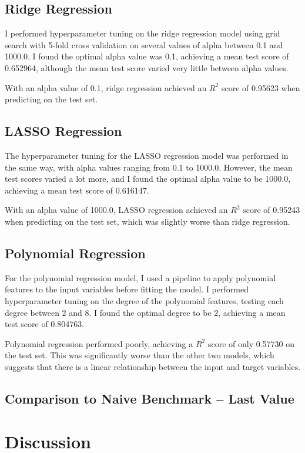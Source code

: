 \documentclass[a4paper, 11pt]{article}
\begin{document}
\subsection{Ridge Regression}
I performed hyperparameter tuning on the ridge regression model using grid search with 5-fold cross validation on several values of alpha between 0.1 and 1000.0. I found the optimal alpha value was 0.1, achieving a mean test score of 0.652964, although the mean test score varied very little between alpha values.

With an alpha value of 0.1, ridge regression achieved an $R^2$ score of 0.95623 when predicting on the test set.

\subsection{LASSO Regression}
The hyperparameter tuning for the LASSO regression model was performed in the same way, with alpha values ranging from 0.1 to 1000.0. However, the mean test scores varied a lot more, and I found the optimal alpha value to be 1000.0, achieving a mean test score of 0.616147.

With an alpha value of 1000.0, LASSO regression achieved an $R^2$ score of 0.95243 when predicting on the test set, which was slightly worse than ridge regression.

\subsection{Polynomial Regression}
For the polynomial regression model, I used a pipeline to apply polynomial features to the input variables before fitting the model. I performed hyperparameter tuning on the degree of the polynomial features, testing each degree between 2 and 8. I found the optimal degree to be 2, achieving a mean test score of 0.804763.

Polynomial regression performed poorly, achieving a $R^2$ score of only 0.57730 on the test set. This was significantly worse than the other two models, which suggests that there is a linear relationship between the input and target variables.

\subsection{Comparison to Naive Benchmark -- Last Value}

\section{Discussion}
\end{document}
